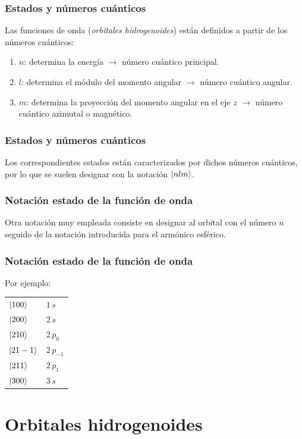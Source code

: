 \documentclass[12pt]{beamer}
\begin{document}
\begin{frame}
\frametitle{Estados y números cuánticos}
Las funciones de onda (\emph{orbitales hidrogenoides}) están definidos a partir de los números cuánticos:
\pause
{}
\begin{enumerate}[<+->]
\item $n$: determina la energía \pause $\to$ número cuántico principal.
\item $l$: determina el módulo del momento angular \pause $\to$ número cuántico angular.
\item $m$: determina la proyección del momento angular en el eje $z$ \pause $\to$ número cuántico azimutal o magnético.
\end{enumerate}
\end{frame}
\begin{frame}
\frametitle{Estados y números cuánticos}
Los correspondientes estados están caracterizados por dichos números cuánticos, por lo que se suelen designar con la notación $\ket{n l m}$.
\end{frame}
\begin{frame}
\frametitle{Notación estado de la función de onda}
Otra notación muy empleada consiste en designar al orbital con el número $n$ seguido de la notación introducida para el armónico esférico.
\end{frame}
\begin{frame}
\frametitle{Notación estado de la función de onda}
Por ejemplo:
\pause
\begin{table}[H]
   \renewcommand{\arraystretch}{1.3}
   \centering
   \begin{tabular}{l l}
      $\ket{100}$ & $1 \, s$ \\ \pause
      $\ket{200}$ & $2 \, s$ \\ \pause
      $\ket{210}$ & $2 \, p_{0}$ \\ \pause
      $\ket{21-1}$ & $2 \, p_{-1}$ \\ \pause
      $\ket{211}$ & $2 \, p_{1}$ \\ \pause
      $\ket{300}$ & $3 \, s$ \\
   \end{tabular}
\end{table}
\end{frame}

\section{Orbitales hidrogenoides}
\end{document}

